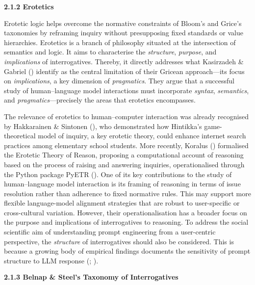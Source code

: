 \documentclass[
  12pt,
]{article}
\begin{document}
\textbf{2.1.2 Erotetics}

Erotetic logic helps overcome the normative constraints of Bloom's and Grice's taxonomies by reframing inquiry without presupposing fixed standards or value hierarchies. Erotetics is a branch of philosophy situated at the intersection of semantics and logic. It aims to characterise the \emph{structure}, \emph{purpose}, and \emph{implications} of interrogatives. Thereby, it directly addresses what Kasirzadeh \& Gabriel () identify as the central limitation of their Gricean approach---its focus on \emph{implications}, a key dimension of \emph{pragmatics}. They argue that a successful study of human--language model interactions must incorporate \emph{syntax}, \emph{semantics}, and \emph{pragmatics}---precisely the areas that erotetics encompasses.

The relevance of erotetics to human--computer interaction was already recognised by Hakkarainen \& Sintonen (), who demonstrated how Hintikka's game-theoretical model of inquiry, a key erotetic theory, could enhance internet search practices among elementary school students. More recently, Koralus () formalised the Erotetic Theory of Reason, proposing a computational account of reasoning based on the process of raising and answering inquiries, operationalised through the Python package PyETR (). One of its key contributions to the study of human--language model interaction is its framing of reasoning in terms of issue resolution rather than adherence to fixed normative rules. This may support more flexible language-model alignment strategies that are robust to user-specific or cross-cultural variation. However, their operationalisation has a broader focus on the purpose and implications of interrogatives to reasoning. To address the social scientific aim of understanding prompt engineering from a user-centric perspective, the \emph{structure} of interrogatives should also be considered. This is because a growing body of empirical findings documents the sensitivity of prompt structure to LLM response (; ).

\textbf{2.1.3 Belnap \& Steel's Taxonomy of Interrogatives}
\end{document}
